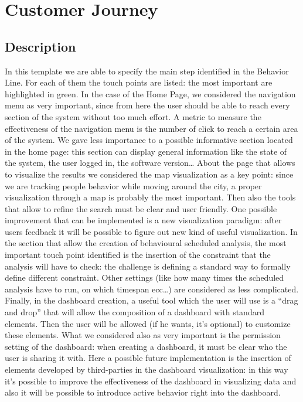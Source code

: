 \documentclass[../main.tex]{subfiles}
\begin{document}
    \chapter{Customer Journey}\label{ch:customer-journey}
    \section{Description}\label{sec:description}
    In this template we are able to specify the main step identified in the Behavior Line.
    For each of them the touch points are listed: the most important are highlighted in green. In the case of the Home Page, we considered the navigation menu as very important, since from here the user should be able to reach every section of the system without too much effort. A metric to measure the effectiveness of the navigation menu is the number of click to reach a certain area of the system. We gave less importance to a possible informative section located in the home page: this section can display general information like the state of the system, the user logged in, the software version…
    About the page that allows to visualize the results we considered the map visualization as a key point: since we are tracking people behavior while moving around the city, a proper visualization through a map is probably the most important. Then also the tools that allow to refine the search must be clear and user friendly. One possible improvement that can be implemented is a new visualization paradigm: after users feedback it will be possible to figure out new kind of useful visualization.
    In the section that allow the creation of behavioural scheduled analysis, the most important touch point identified is the insertion of the constraint that the analysis will have to check: the challenge is defining a standard way to formally define different constraint. Other settings (like how many times the scheduled analysis have to run, on which timespan ecc…) are considered as less complicated.
    Finally, in the dashboard creation, a useful tool which the user will use is a “drag and drop” that will allow the composition of a dashboard with standard elements. Then the user will be allowed (if he wants, it’s optional) to customize these elements. What we considered also as very important is the permission setting of the dashboard: when creating a dashboard, it must be clear who the user is sharing it with. Here a possible future implementation is the insertion of elements developed by third-parties in the dashboard visualization: in this way it’s possible to improve the effectiveness of the dashboard in visualizing data and also it will be possible to introduce active behavior right into the dashboard.
\end{document}
